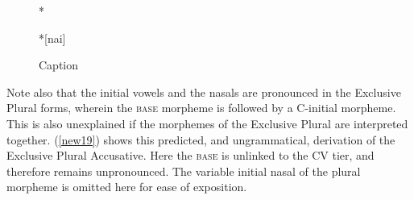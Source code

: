 \documentclass[output=paper,colorlinks,citecolor=brown,
]{langscibook}
\begin{document}
\begin{figure}
    \centering
    \begin{minipage}[t]{.1\textwidth}
        *
    \end{minipage}
    \begin{minipage}[t]{.3\textwidth}
    \end{minipage}
    \begin{minipage}[t]{.1\textwidth}
        \rightarrow 
    \end{minipage}
    \begin{minipage}[t]{.3\textwidth}
        \centering
        *[nai]
    \end{minipage}
    \caption{Caption}
    \label{new18}
\end{figure}

Note also that the initial vowels and the nasals are pronounced in the Exclusive Plural forms, wherein the \textsc{base} morpheme is followed by a C-initial morpheme. This is also unexplained if the morphemes of the Exclusive Plural are interpreted together. (\ref{new19}) shows this predicted, and ungrammatical, derivation of the Exclusive Plural Accusative. Here the \textsc{base} is unlinked to the CV tier, and therefore remains unpronounced. The variable initial nasal of the plural morpheme is omitted here for ease of exposition.
\end{document}
